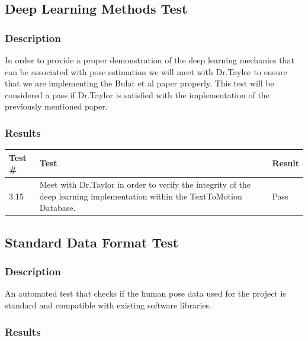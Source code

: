 \documentclass{scrreprt}
\begin{document}
\subsection{Deep Learning Methods Test}
\subsubsection{Description}

In order to provide a proper demonstration of the deep learning mechanics that can be associated with pose estimation we will meet with Dr.Taylor to ensure that we are implementing the Bulat et al paper properly. This test will be considered a pass if Dr.Taylor is satisfied with the implementation of the previously mentioned paper.

\subsubsection{Results}

\begin{table}[H]
        \centering
        \begin{tabular}{||p{0.75cm}|p{7.5cm}|p{1cm}||}
                \hline
                \textbf Test \# & \textbf Test & \textbf Result\\
                \hline\hline
                3.15 & Meet with Dr.Taylor in order to verify the integrity of the deep learning implementation within the TextToMotion Database. & Pass\\ %
                \hline
        \end{tabular}
\end{table}

\subsection{Standard Data Format Test}

\subsubsection{Description}

An automated test that checks if the human pose data used for the project is
standard and compatible with existing software libraries.

\subsubsection{Results}
\end{document}
